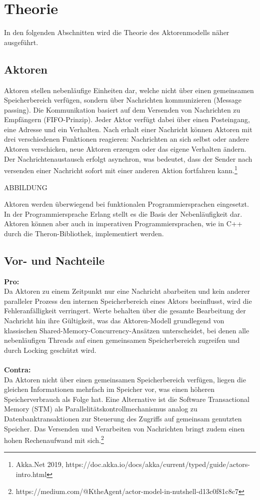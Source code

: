 \section{Theorie}\label{sec:theory}

In den folgenden Abschnitten wird die Theorie des Aktorenmodells näher ausgeführt.

\subsection{Aktoren}

Aktoren stellen nebenläufige Einheiten dar, welche nicht über einen gemeinsamen Speicherbereich verfügen, sondern über Nachrichten kommunizieren (Message passing). Die Kommunikation basiert auf dem Versenden von Nachrichten zu Empfängern (FIFO-Prinzip). Jeder Aktor verfügt dabei über einen Posteingang, eine Adresse und ein Verhalten. Nach erhalt einer Nachricht können Aktoren mit drei verschiedenen Funktionen reagieren: Nachrichten an sich selbst oder andere Aktoren verschicken, neue Aktoren erzeugen oder das eigene Verhalten ändern. Der Nachrichtenaustausch erfolgt asynchron, was bedeutet, dass der Sender nach versenden einer Nachricht sofort mit einer anderen Aktion fortfahren kann.\footnote{Akka.Net 2019, https://doc.akka.io/docs/akka/current/typed/guide/actors-intro.html}

ABBILDUNG 

Aktoren werden überwiegend bei funktionalen Programmiersprachen eingesetzt. In der Programmiersprache Erlang stellt es die Basis der Nebenläufigkeit dar. Aktoren können aber auch in imperativen Programmiersprachen, wie in C++ durch die Theron-Bibliothek, implementiert werden.

\subsection{Vor- und Nachteile}

\textbf{Pro:}
\\
Da Aktoren zu einem Zeitpunkt nur eine Nachricht abarbeiten und kein anderer paralleler Prozess den internen Speicherbereich eines Aktors beeinflusst, wird die Fehleranfälligkeit verringert. Werte behalten über die gesamte Bearbeitung der Nachricht hin ihre Gültigkeit, was das Aktoren-Modell grundlegend von klassischen Shared-Memory-Concurrency-Ansätzen unterscheidet, bei denen alle nebenläufigen Threads auf einen gemeinsamen Speicherbereich zugreifen und durch Locking geschützt wird.
\\
\\
\textbf{Contra:}
\\
Da Aktoren nicht über einen gemeinsamen Speicherbereich verfügen, liegen die gleichen Informationen mehrfach im Speicher vor, was einen höheren Speicherverbrauch als Folge hat. Eine Alternative ist die Software Transactional Memory (STM) als Parallelitätskontrollmechanismus analog zu Datenbanktransaktionen zur Steuerung des Zugriffs auf gemeinsam genutzten Speicher. Das Versenden und Verarbeiten von Nachrichten bringt zudem einen hohen Rechenaufwand mit sich.\footnote{https://medium.com/@KtheAgent/actor-model-in-nutshell-d13c0f81c8c7}

